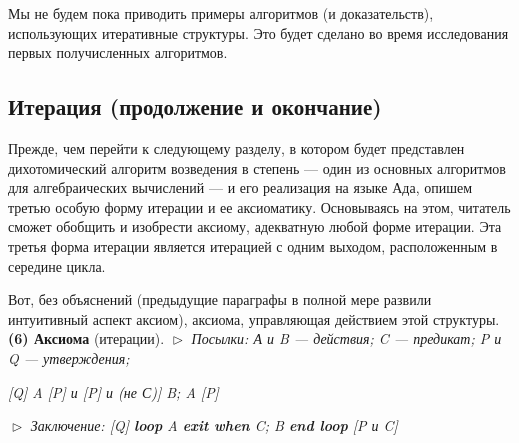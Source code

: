 Мы  не  будем  пока  приводить  примеры  алгоритмов (и доказа­тельств), использующих  итеративные  структуры.  Это  будет  сделано 
во время исследования первых получисленных алгоритмов.
\subsection{Итерация (продолжение и окончание)}
							\noindent Прежде,  чем  перейти  к  следующему  разделу,  в  
							ко­тором будет представлен дихотомический алгоритм 
							возведения в степень — один  из  основных алгорит­мов для алгебраических вычислений — и его реали­зация  на языке Ада, опишем третью особую форму 
							итерации и ее аксиоматику.  Основываясь на  этом,
читатель  сможет  обобщить  и  изобрести  аксиому,  адекватную  любой 
форме  итерации.  Эта  третья  форма  итерации  является  итерацией  с 
одним выходом, расположенным в середине цикла.

Вот, без объяснений (предыдущие параграфы в полной мере развили 
интуитивный  аспект  аксиом),  аксиома,  управляющая  действием  этой\linebreak 
структуры.
\newline
\textbf{(6) Аксиома} (итерации).
\newline
$\vartriangleright$ \textit{Посылки: А и B --- действия; C --- предикат; P и Q --- утверждения;}
\begin{center}
\textit{[Q] A [P] и [P] и (не С)] B; A [P]}
\end{center}
$\vartriangleright$ \textit{Заключение:  \textit{[Q]} \textbf{loop} \textit{A} \textbf{exit when} \textit{C}; \textit{B} \textbf{end loop} \textit{[P и C]}}

